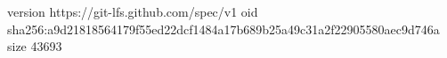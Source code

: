 version https://git-lfs.github.com/spec/v1
oid sha256:a9d21818564179f55ed22dcf1484a17b689b25a49c31a2f22905580aec9d746a
size 43693
